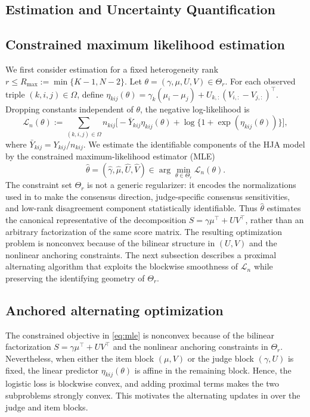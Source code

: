 \documentclass{article}
\begin{document}
\begin{bibunit}[unsrtnat]
\section{Estimation and Uncertainty Quantification}\label{sec:est-uq}
\subsection{Constrained maximum likelihood estimation}\label{subsec:estimation}

We first consider estimation for a fixed heterogeneity rank
\(r \leq R_{\max}:=\min\{K-1,N-2\}\). Let
\(\theta=(\gamma,\mu,U,V)\in\Theta_r\). For each observed triple
\((k,i,j)\in\Omega\), define
\(
\eta_{kij}(\theta)=
\gamma_k(\mu_i-\mu_j)
+
U_{k,:}(V_{i,:}-V_{j,:})^\top .
\)
Dropping constants independent of \(\theta\), the negative log-likelihood is
\begin{equation} \label{eq:ll}
\mathcal{L}_n(\theta)
:=
\sum_{(k,i,j)\in\Omega}
n_{kij}
\Big[
-\bar{Y}_{kij}\eta_{kij}(\theta)
+
\log\big\{1+\exp(\eta_{kij}(\theta))\big\}
\Big],
\end{equation}
where \(\bar{Y}_{kij}=Y_{kij}/n_{kij}\). We estimate the identifiable
components of the HJA model by the constrained maximum-likelihood estimator (MLE)
\begin{equation}
\widehat{\theta}
=
(\widehat{\gamma},\widehat{\mu},\widehat{U},\widehat{V})
\in
\arg\min_{\theta\in\Theta_r}
\mathcal{L}_n(\theta).
\label{eq:mle}
\end{equation}
The constraint set \(\Theta_r\) is not a generic regularizer: it encodes the normalizations used in  to make the consensus direction, judge-specific consensus sensitivities, and low-rank disagreement component statistically identifiable. 
Thus \(\widehat{\theta}\) estimates the canonical representative of the decomposition \(S=\gamma\mu^\top+UV^\top\), rather than an arbitrary factorization of the same score matrix.
The resulting optimization problem is nonconvex because of the bilinear structure in \((U,V)\) and the nonlinear anchoring constraints. 
The next subsection describes a proximal alternating algorithm that exploits the blockwise smoothness of \(\mathcal{L}_n\) while preserving the identifying geometry of \(\Theta_r\).


\subsection{Anchored alternating optimization}\label{subsec:optimization}
The constrained objective in \eqref{eq:mle} is nonconvex because of the bilinear factorization \(S=\gamma\mu^\top+UV^\top\) and the nonlinear anchoring constraints in \(\Theta_r\). 
Nevertheless, when either the item block \((\mu,V)\) or the judge block \((\gamma,U)\) is fixed, the linear predictor \(\eta_{kij}(\theta)\) is affine in the remaining block. 
Hence, the logistic loss is blockwise convex, and adding proximal terms makes the two subproblems strongly convex. This motivates the alternating updates in  over the judge and item blocks.


\end{bibunit}
\end{document}
